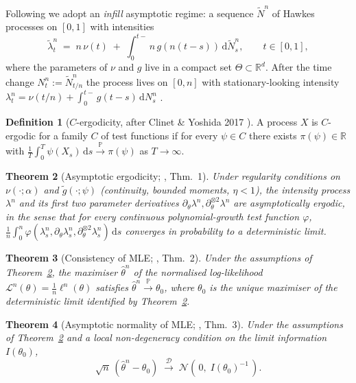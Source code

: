 \documentclass[article,shortnames,nojss]{jss}
\providecommand{\coloneqq}{\mathrel{:=}}
\providecommand{\Rset}{\mathbb{R}}
\newcommand{\rmd}{\,\mathrm{d}}
\newcommand{\PP}{\mathbb{P}}
\newcommand{\1}{\mathbbm{1}}
\newcommand{\defeq}{\coloneqq}
\newcommand{\converginP}{\overset{\PP}{\rightarrow}}
\newcommand{\converginD}{\overset{\mathcal{D}}{\rightarrow}}
\theoremstyle{plain}
\newtheorem{theorem}{Theorem}
\theoremstyle{definition}
\newtheorem{definition}[theorem]{Definition}
\begin{document}
Following \citep{kwan2024ergodic,kwan2025nonstationary} we adopt an
\emph{infill} asymptotic regime: a sequence $\tilde N^n$ of Hawkes
processes on $[0,1]$ with intensities
\begin{equation}\label{eq:infill}
  \tilde\lambda^n_t \;=\; n\,\nu(t)
  \;+\; \int_{0}^{t-}\! n\,g\!\left(n(t-s)\right)\rmd \tilde N^n_s,
  \qquad t\in[0,1],
\end{equation}
where the parameters of $\nu$ and $g$ live in a compact set
$\Theta \subset \Rset^d$.  After the time change $N^n_t \defeq \tilde
N^n_{t/n}$ the process lives on $[0,n]$ with stationary-looking
intensity $\lambda^n_t = \nu(t/n) + \int_0^{t-} g(t-s) \rmd N^n_s$
\citep[\S2]{kwan2025nonstationary}.

\begin{definition}[$C$-ergodicity, after Clinet \& Yoshida 2017 \citep{clinet2017statistical}]
A process $X$ is $C$-ergodic for a family $C$ of test functions if
for every $\psi \in C$ there exists $\pi(\psi) \in \Rset$ with
$\frac1T \int_0^T \psi(X_s)\rmd s \converginP \pi(\psi)$ as
$T\to\infty$.
\end{definition}

\begin{theorem}[Asymptotic ergodicity; \citep{kwan2025nonstationary}, Thm.~1]
\label{thm:ergodicity}
Under regularity conditions on $\nu(\cdot;\alpha)$ and
$\tilde g(\cdot;\psi)$ (continuity, bounded moments, $\eta<1$), the
intensity process $\lambda^n$ and its first two parameter
derivatives $\partial_\theta\lambda^n,\partial_\theta^{\otimes 2}\lambda^n$
are asymptotically ergodic, in the sense that for every continuous
polynomial-growth test function $\varphi$,
$\frac1n\!\int_0^n\!\varphi(\lambda^n_s,\partial_\theta\lambda^n_s,
\partial_\theta^{\otimes 2}\lambda^n_s)\rmd s$ converges in
probability to a deterministic limit.
\end{theorem}

\begin{theorem}[Consistency of MLE; \citep{kwan2025nonstationary}, Thm.~2]
\label{thm:consistency}
Under the assumptions of Theorem~\ref{thm:ergodicity},
the maximiser $\hat\theta^n$ of the normalised log-likelihood
$\mathcal{L}^n(\theta) = \frac1n\ell^n(\theta)$ satisfies
$\hat\theta^n \converginP \theta_0$, where $\theta_0$ is the
unique maximiser of the deterministic limit identified by
Theorem~\ref{thm:ergodicity}.
\end{theorem}

\begin{theorem}[Asymptotic normality of MLE; \citep{kwan2025nonstationary}, Thm.~3]
\label{thm:asym-normality}
Under the assumptions of Theorem~\ref{thm:ergodicity} and a local
non-degeneracy condition on the limit information $I(\theta_0)$,
\begin{equation}\label{eq:clt}
  \sqrt{n}\,(\hat\theta^n - \theta_0)
  \;\converginD\; \mathcal{N}\!\left(\,0,\; I(\theta_0)^{-1}\,\right).
\end{equation}
\end{theorem}
\end{document}
